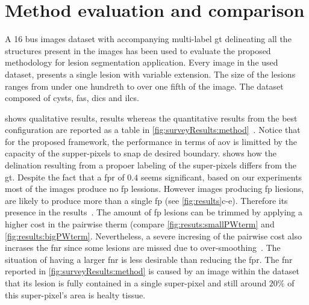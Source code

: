 \graphicspath{ {./content/results/figures/} }

\section{Method evaluation and comparison} 
A 16 \ac{bus} images dataset with accompanying multi-label \ac{gt} delineating all the structures present in the images has been used to evaluate the proposed methodology for lesion segmentation application.
Every image in the used dataset, presents a single lesion with variable extension. 
The size of the lesions ranges from under one hundreth to over one fifth of the image.
The dataset composed of cysts, \acp{fa}, \acp{dic} and \acp{ilc}.

 shows qualitative results, results whereas the quantitative results from the best configuration are reported as a table in \cref{fig:surveyResults:method}~\cite{massich2013phd}.
Notice that for the proposed framework, the performance in terms of \ac{aov} is limitted by the capacity of the supper-pixels to snap de desired boundary.
 shows how the delination resulting from a propoer labeling of the super-pixels differs from the \ac{gt}.
Despite the fact that a \ac{fpr} of $0.4$ seems significant, based on our experiments most of the images produce no \ac{fp} lessions.
However images producing \ac{fp} liesions, are likely to produce more than a single \ac{fp} (see \cref{fig:results}c-e).
Therefore its presence in the results~\cite{massich2013phd}.
The amount of \ac{fp} lesions can be trimmed by applying a higher cost in the pairwise therm (compare \cref{fig:resuts:smallPWterm} and \cref{fig:results:bigPWterm}.
Nevertheless, a severe incresing of the pairwise cost also incrases the \ac{fnr} since some lesions are missed due to over-smoothing~\cite{massich2013phd}.
The situation of having a larger \ac{fnr} is less desirable than reducing the \ac{fpr}. 
The \ac{fnr} reported in \cref{fig:surveyResults:method} is caused by an image within the dataset that its lesion is fully contained in a single super-pixel and still around $20\%$ of this super-pixel's area is healty tissue. 

